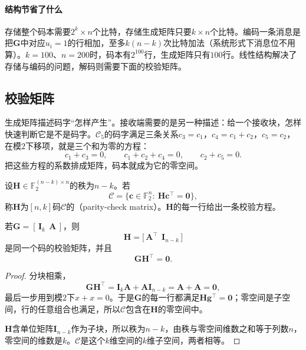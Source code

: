 \paragraph{结构节省了什么}
存储整个码本需要$2^{k}\times n$个比特，存储生成矩阵只要$k\times n$个比特。编码一条消息是把$\bm{G}$中对应$u_i=1$的行相加，至多$k(n-k)$次比特加法（系统形式下消息位不用算）。$k=100$、$n=200$时，码本有$2^{100}$行，生成矩阵只有$100$行。线性结构解决了存储与编码的问题，解码则需要下面的校验矩阵。

\subsection{校验矩阵}
\label{sec:ccode-parity-check}

生成矩阵描述码字“怎样产生”。接收端需要的是另一种描述：给一个接收块，怎样快速判断它是不是码字。$\mathcal{C}_5$的码字满足三条关系$c_3=c_1$，$c_4=c_1+c_2$，$c_5=c_2$，在模$2$下移项，就是三个和为零的方程：
\[
 c_1+c_3=0,\qquad c_1+c_2+c_4=0,\qquad c_2+c_5=0 .
\]
把这些方程的系数排成矩阵，码本就成为它的零空间。

\begin{definition}[校验矩阵]
\label{def:ccode-parity-check}
设$\bm{H}\in\mathbb{F}_2^{(n-k)\times n}$的秩为$n-k$。若
\begin{equation}
 \mathcal{C}=\bigl\{\bm{c}\in\mathbb{F}_2^{n}:\ \bm{H}\bm{c}^{\top}=\bm{0}\bigr\},
 \label{eq:ccode-null-space}
\end{equation}
称$\bm{H}$为$[n,k]$码$\mathcal{C}$的（parity-check matrix）。$\bm{H}$的每一行给出一条校验方程。
\end{definition}

\begin{lemma}[由系统形式构造校验矩阵]
\label{lem:ccode-h-from-g}
若$\bm{G}=[\,\bm{I}_k\ \ \bm{A}\,]$，则
\begin{equation}
 \bm{H}=\bigl[\,\bm{A}^{\top}\ \ \bm{I}_{n-k}\,\bigr]
 \label{eq:ccode-h-systematic}
\end{equation}
是同一个码的校验矩阵，并且
\begin{equation}
 \bm{G}\bm{H}^{\top}=\bm{0} .
 \label{eq:ccode-gh}
\end{equation}
\end{lemma}

\begin{proof}
分块相乘，
\[
 \bm{G}\bm{H}^{\top}=\bm{I}_k\bm{A}+\bm{A}\bm{I}_{n-k}=\bm{A}+\bm{A}=\bm{0},
\]
最后一步用到模$2$下$x+x=0$。于是$\bm{G}$的每一行都满足$\bm{H}\bm{g}^{\top}=\bm{0}$；零空间是子空间，行的任意组合也满足，所以$\mathcal{C}$包含在$\bm{H}$的零空间中。

$\bm{H}$含单位矩阵$\bm{I}_{n-k}$作为子块，所以秩为$n-k$，由秩与零空间维数之和等于列数$n$，零空间的维数是$k$。$\mathcal{C}$是这个$k$维空间的$k$维子空间，两者相等。
\end{proof}


